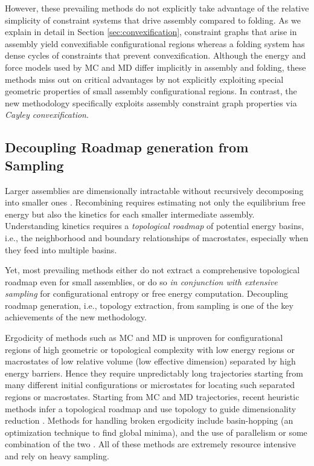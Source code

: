 \documentclass[]{article}
\begin{document}
However, these prevailing methods do not explicitly take advantage of the
relative simplicity of constraint systems that drive assembly compared to
folding. As we explain in detail in Section \ref{sec:convexification},
constraint graphs that arise in assembly yield convexifiable configurational
regions whereas a folding system has dense cycles of constraints that prevent
convexification. Although the energy and force models used by MC and MD differ
implicitly in assembly and folding, these methods miss out on critical
advantages by not explicitly exploiting special geometric properties of small
assembly configurational regions. In contrast, the new methodology specifically
exploits assembly constraint graph properties via \emph{Cayley
convexification}\cite{SiGa:2010}. 

\subsection{Decoupling Roadmap generation from Sampling}
\label{sec:intro:Decoupling} 
Larger assemblies are dimensionally intractable without recursively decomposing
into smaller ones \cite{Wu2012}. Recombining requires estimating not only the
equilibrium free energy but also the kinetics for each smaller intermediate
assembly. Understanding kinetics requires a \emph{topological roadmap} of
potential energy basins, i.e., the neighborhood and boundary relationships of
macrostates, especially when they feed into multiple basins. 

Yet, most prevailing methods either do not extract a comprehensive topological
roadmap even for small assemblies, or do so \emph{in conjunction with extensive
sampling} for configurational entropy or free energy computation. Decoupling
roadmap generation, i.e., topology extraction, from sampling is one of the key
achievements of the new methodology.

Ergodicity of methods such as MC and MD is unproven for configurational regions
of high geometric or topological complexity with low energy regions or
macrostates of low relative volume (low effective dimension) separated by high
energy barriers. Hence they require unpredictably long trajectories starting
from many different initial configurations or microstates for locating such
separated regions or macrostates. Starting from MC and MD trajectories, recent
heuristic methods infer a topological roadmap
\cite{Gfeller_DeLachapelle_DeLos_Rios_Caldarelli_Rao_2007,
Varadhan_Kim_Krishnan_Manocha_2006, Lai_Su_Chen_Wang_2009,
10.1371/journal.pcbi.1000415} and use topology to guide dimensionality
reduction \cite{Yao_Sun_Huang_Bowman_Singh_Lesnick_Guibas_Pande_Carlsson_2009}.
Methods for handling broken ergodicity include basin-hopping \cite{WALES20131}
(an optimization technique to find global minima), and the use of parallelism
\cite{earl2005parallel} or some combination of the two
\cite{Griffiths2019,Wales:Landscapes}. All of these methods are extremely
resource intensive and rely on heavy sampling.
\end{document}
